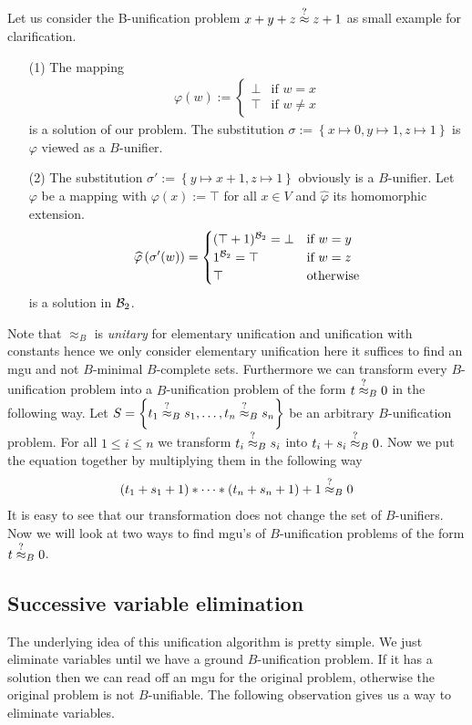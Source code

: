 		Let us consider the B-unification problem $x+y+z\stackrel{?}{\approx} z+1$ as small example for clarification.
		\begin{itemize}
		\item[(1)]The mapping 
		\begin{align*}
		\varphi(w):=\begin{cases}
		\bot& \text{if }w=x\\
		\top& \text{if }w\neq x
		\end{cases}
		\end{align*}is a solution of our problem. The substitution $\sigma:=\left\lbrace x\mapsto0,y\mapsto1,z\mapsto1\right\rbrace$ is $\varphi$ viewed as a $B$-unifier.
		\item[(2)]The substitution $\sigma':=\left\lbrace y\mapsto x+1,z\mapsto 1\right\rbrace $ obviously is a $B$-unifier. Let $\varphi$ be a mapping with $\varphi(x):=\top$ for all $x\in V$ and $\widehat{\varphi}$ its homomorphic extension.
		\begin{align*}
		\widehat{\varphi}\left(\sigma'(w)\right)=\begin{cases}
		(\top+1)^{\mathcal{B}_2}=\bot& \text{if } w=y\\
		1^{\mathcal{B}_2}=\top& \text{if } w=z\\
		\top&  \text{otherwise}
		\end{cases}
		\end{align*}
		is a solution in ${\mathcal{B}_2}$.
		\end{itemize}
		Note that $\approx_B$ is \emph{unitary} for elementary unification and unification with constants hence we only consider elementary unification here it suffices to find an mgu and not $B$-minimal $B$-complete sets. Furthermore we can transform every $B$-unification problem into a $B$-unification problem of the form $t\stackrel{?}{\approx}_B0$ in the following way. Let $S=\left\lbrace t_1\stackrel{?}{\approx}_Bs_1,\dots,t_n\stackrel{?}{\approx}_Bs_n\right\rbrace$ be an arbitrary $B$-unification problem. For all $1\leq i\leq n$ we transform $t_i\stackrel{?}{\approx}_Bs_i$ into $t_i+s_i\stackrel{?}{\approx}_B0$. Now we put the equation together by multiplying them in the following way 
		\begin{align*}
		(t_1+s_1+1)*\dots*(t_n+s_n+1)+1\stackrel{?}{\approx}_B0
		\end{align*}
		It is easy to see that our transformation does not change the set of $B$-unifiers. Now we will look at two ways to find mgu's of $B$-unification problems of the form $t\stackrel{?}{\approx}_B0$.
		\subsection{Successive variable elimination}
		The underlying idea of this unification algorithm is pretty simple. We just eliminate variables until we have a ground $B$-unification problem. If it has a solution then we can read off an mgu for the original problem, otherwise the original problem is not $B$-unifiable. The following observation gives us a way to eliminate variables.
		
